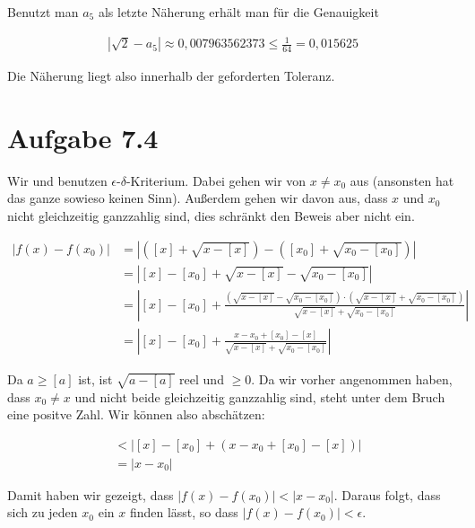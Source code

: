 \documentclass[a4paper,german,12pt,smallheadings]{scrartcl}
\begin{document}
Benutzt man $a_5$ als letzte Näherung erhält man für die Genauigkeit

\begin{align*}
  |\sqrt{2} - a_5| \approx 0{,}007963562373 \le \frac{1}{64} = 0{,}015625
\end{align*}

Die Näherung liegt also innerhalb der geforderten Toleranz.

\section*{Aufgabe 7.4}

Wir und benutzen $\epsilon$-$\delta$-Kriterium. Dabei gehen wir von $x \neq
x_0$ aus (ansonsten hat das ganze sowieso keinen Sinn). Außerdem gehen wir
davon aus, dass $x$ und $x_0$ nicht gleichzeitig ganzzahlig sind, dies schränkt
den Beweis aber nicht ein.

\begin{align*}
  |f(x) - f(x_0)| &= \left|([x] + \sqrt{x-[x]}) - ([x_0] + \sqrt{x_0 - [x_0]})\right| \\
                  &= \left|[x] - [x_0] + \sqrt{x-[x]} - \sqrt{x_0 - [x_0]}\right| \\
                  &= \left|[x] - [x_0] + \frac{(\sqrt{x-[x]} - \sqrt{x_0 - [x_0]}) \cdot (\sqrt{x-[x]} + \sqrt{x_0 - [x_0]})}{\sqrt{x-[x]} + \sqrt{x_0 - [x_0]}}\right| \\
                  &= \left|[x] - [x_0] + \frac{x-x_0+[x_0]-[x]}{\sqrt{x-[x]} + \sqrt{x_0 - [x_0]}}\right|
\end{align*}

Da $a \ge [a]$ ist, ist $\sqrt{a - [a]}$ reel und $\ge 0$. Da wir vorher
angenommen haben, dass $x_0 \neq x$ und nicht beide gleichzeitig ganzzahlig
sind, steht unter dem Bruch eine positve Zahl. Wir können also abschätzen:

\begin{align*}
  &< \left|[x] - [x_0] + (x-x_0+[x_0]-[x])\right| \\
  &= \left|x-x_0\right|
\end{align*}

Damit haben wir gezeigt, dass $|f(x) - f(x_0)| < |x-x_0|$. Daraus folgt, dass sich
zu jeden $x_0$ ein $x$ finden lässt, so dass $|f(x) - f(x_0)| < \epsilon$.
\end{document}
